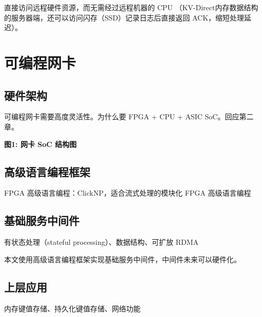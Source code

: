 直接访问远程硬件资源，而无需经过远程机器的 CPU （KV-Direct内存数据结构的服务器端，还可以访问闪存（SSD）记录日志后直接返回 ACK，缩短处理延迟）。


\section{可编程网卡}

\subsection{硬件架构}

可编程网卡需要高度灵活性。为什么要 FPGA + CPU + ASIC SoC。回应第二章。

\textbf{图1: 网卡 SoC 结构图}

\subsection{高级语言编程框架}

FPGA 高级语言编程：ClickNP，适合流式处理的模块化 FPGA 高级语言编程

\subsection{基础服务中间件}

有状态处理（stateful processing）、数据结构、可扩放 RDMA

本文使用高级语言编程框架实现基础服务中间件，中间件未来可以硬件化。

\subsection{上层应用}

内存键值存储、持久化键值存储、网络功能